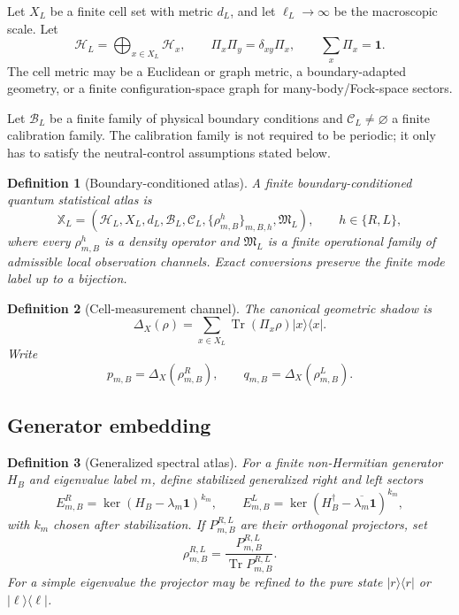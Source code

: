 \documentclass[11pt]{article}
\newtheorem{definition}{Definition}
\newcommand{\Tr}{\operatorname{Tr}}
\newcommand{\id}{\mathbf 1}
\newcommand{\calB}{\mathcal B}
\newcommand{\calC}{\mathcal C}
\newcommand{\HH}{\mathcal H}
\begin{document}
Let \(X_L\) be a finite cell set with metric \(d_L\), and let \(\ell_L\to\infty\) be the macroscopic scale. Let
\[
\HH_L=\bigoplus_{x\in X_L}\HH_x,
\qquad
\Pi_x\Pi_y=\delta_{xy}\Pi_x,
\qquad
\sum_x\Pi_x=\id.
\]
The cell metric may be a Euclidean or graph metric, a boundary-adapted geometry, or a finite configuration-space graph for many-body/Fock-space sectors.

Let \(\calB_L\) be a finite family of physical boundary conditions and \(\calC_L\neq\varnothing\) a finite calibration family. The calibration family is not required to be periodic; it only has to satisfy the neutral-control assumptions stated below.

\begin{definition}[Boundary-conditioned atlas]
A finite boundary-conditioned quantum statistical atlas is
\[
\mathbb X_L=
(\HH_L,X_L,d_L,\calB_L,\calC_L,
\{\rho_{m,B}^{h}\}_{m,B,h},\mathfrak M_L),
\qquad h\in\{R,L\},
\]
where every \(\rho_{m,B}^{h}\) is a density operator and \(\mathfrak M_L\) is a finite operational family of admissible local observation channels. Exact conversions preserve the finite mode label up to a bijection.
\end{definition}

\begin{definition}[Cell-measurement channel]
The canonical geometric shadow is
\[
\Delta_X(\rho)=\sum_{x\in X_L}\Tr(\Pi_x\rho)|x\rangle\langle x|.
\]
Write
\[
p_{m,B}=\Delta_X(\rho_{m,B}^{R}),
\qquad
q_{m,B}=\Delta_X(\rho_{m,B}^{L}).
\]
\end{definition}

\subsection{Generator embedding}

\begin{definition}[Generalized spectral atlas]
For a finite non-Hermitian generator \(H_B\) and eigenvalue label \(m\), define stabilized generalized right and left sectors
\[
E_{m,B}^{R}=\ker(H_B-\lambda_m\id)^{k_m},
\qquad
E_{m,B}^{L}=\ker(H_B^\dagger-\overline{\lambda_m}\id)^{k_m},
\]
with \(k_m\) chosen after stabilization. If \(P_{m,B}^{R,L}\) are their orthogonal projectors, set
\[
\rho_{m,B}^{R,L}
=
\frac{P_{m,B}^{R,L}}{\Tr P_{m,B}^{R,L}}.
\]
For a simple eigenvalue the projector may be refined to the pure state \(|r\rangle\langle r|\) or \(|\ell\rangle\langle\ell|\).
\end{definition}
\end{document}
